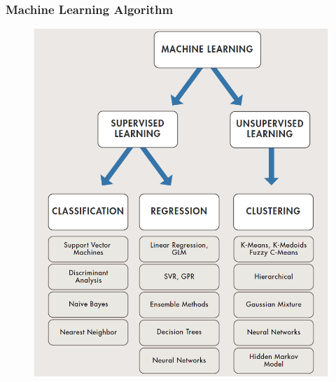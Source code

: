 \documentclass{beamer}
\begin{document}
\begin{frame}
\frametitle{Machine Learning Algorithm}
\begin{figure}
\includegraphics[scale=0.3]{figs/ml_algorithym.PNG}
\end{figure}
\end{frame}
\end{document}
